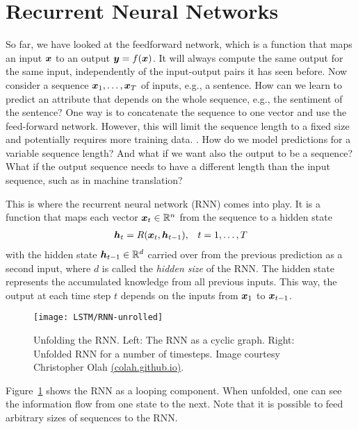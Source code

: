 	\section{Recurrent Neural Networks}\label{sec:recurrent_neural_networks}
		\newcommand{\imagecourtesycolah}{Image courtesy Christopher Olah \mbox{\href{http://colah.github.io/}{(colah.github.io)}}.}
		So far, we have looked at the feedforward network, which is a function that maps an input $\bm{x}$ to an output $\bm{y} = f(\bm{x})$.
		It will always compute the same output for the same input, independently of the input-output pairs it has seen before.
		Now consider a sequence $\bm{x}_1, \dots, \bm{x}_T$ of inputs, e.g., a sentence.
		How can we learn to predict an attribute that depends on the whole sequence, e.g., the sentiment of the sentence?
		One way is to concatenate the sequence to one vector and use the feed-forward network.
		However, this will limit the sequence length to a fixed size and potentially requires more training data.
		.
		How do we model predictions for a variable sequence length?
		And what if we want also the output to be a sequence? 
		What if the output sequence needs to have a different length than the input sequence, such as in machine translation? 
		
		This is where the recurrent neural network (RNN) comes into play.
		It is a function that maps each vector $\bm{x}_t \in \mathbb{R}^n$ from the sequence to a hidden state
		\begin{eqnarray}
			\bm{h}_t = R(\bm{x}_t, \bm{h}_{t-1}), & &t = 1, \dots, T
		\end{eqnarray}
		with the hidden state $\bm{h}_{t-1} \in \mathbb{R}^d$ carried over from the previous prediction as a second input, where $d$ is called the \emph{hidden size} of the RNN. 
		The hidden state represents the accumulated knowledge from all previous inputs.
		This way, the output at each time step $t$ depends on the inputs from $\bm{x}_1$ to $\bm{x}_{t - 1}$.
		\begin{figure}[tb]
			\centering
			\texttt{[image: LSTM/RNN-unrolled]}
			\caption[Unfolding the RNN]
			{Unfolding the RNN. Left: The RNN as a cyclic graph. 
				Right: Unfolded RNN for a number of timesteps.
				\imagecourtesycolah}
			\label{fig:RNN-unrolled}
		\end{figure}
		Figure~\ref{fig:RNN-unrolled} shows the RNN as a looping component.
		When unfolded, one can see the information flow from one state to the next.
		Note that it is possible to feed arbitrary sizes of sequences to the RNN.
		
